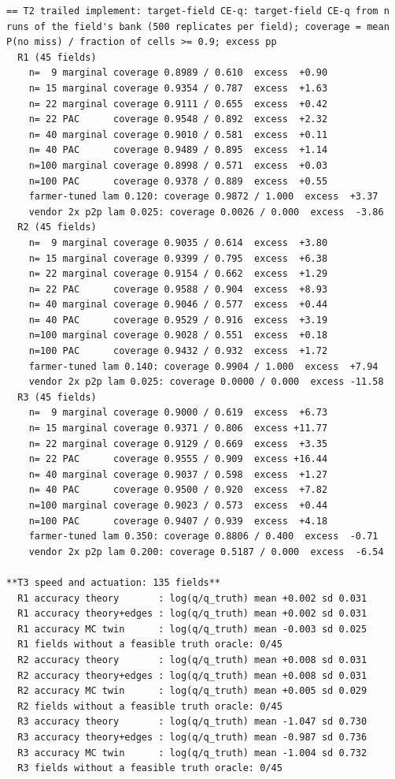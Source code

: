 \documentclass[preprint,12pt,authoryear]{elsarticle}
\begin{document}
\begin{Verbatim}[fontsize=\tiny,breaklines]
== T2 trailed implement: target-field CE-q: target-field CE-q from n runs of the field's bank (500 replicates per field); coverage = mean P(no miss) / fraction of cells >= 0.9; excess pp
  R1 (45 fields)
    n=  9 marginal coverage 0.8989 / 0.610  excess  +0.90
    n= 15 marginal coverage 0.9354 / 0.787  excess  +1.63
    n= 22 marginal coverage 0.9111 / 0.655  excess  +0.42
    n= 22 PAC      coverage 0.9548 / 0.892  excess  +2.32
    n= 40 marginal coverage 0.9010 / 0.581  excess  +0.11
    n= 40 PAC      coverage 0.9489 / 0.895  excess  +1.14
    n=100 marginal coverage 0.8998 / 0.571  excess  +0.03
    n=100 PAC      coverage 0.9378 / 0.889  excess  +0.55
    farmer-tuned lam 0.120: coverage 0.9872 / 1.000  excess  +3.37
    vendor 2x p2p lam 0.025: coverage 0.0026 / 0.000  excess  -3.86
  R2 (45 fields)
    n=  9 marginal coverage 0.9035 / 0.614  excess  +3.80
    n= 15 marginal coverage 0.9399 / 0.795  excess  +6.38
    n= 22 marginal coverage 0.9154 / 0.662  excess  +1.29
    n= 22 PAC      coverage 0.9588 / 0.904  excess  +8.93
    n= 40 marginal coverage 0.9046 / 0.577  excess  +0.44
    n= 40 PAC      coverage 0.9529 / 0.916  excess  +3.19
    n=100 marginal coverage 0.9028 / 0.551  excess  +0.18
    n=100 PAC      coverage 0.9432 / 0.932  excess  +1.72
    farmer-tuned lam 0.140: coverage 0.9904 / 1.000  excess  +7.94
    vendor 2x p2p lam 0.025: coverage 0.0000 / 0.000  excess -11.58
  R3 (45 fields)
    n=  9 marginal coverage 0.9000 / 0.619  excess  +6.73
    n= 15 marginal coverage 0.9371 / 0.806  excess +11.77
    n= 22 marginal coverage 0.9129 / 0.669  excess  +3.35
    n= 22 PAC      coverage 0.9555 / 0.909  excess +16.44
    n= 40 marginal coverage 0.9037 / 0.598  excess  +1.27
    n= 40 PAC      coverage 0.9500 / 0.920  excess  +7.82
    n=100 marginal coverage 0.9023 / 0.573  excess  +0.44
    n=100 PAC      coverage 0.9407 / 0.939  excess  +4.18
    farmer-tuned lam 0.350: coverage 0.8806 / 0.400  excess  -0.71
    vendor 2x p2p lam 0.200: coverage 0.5187 / 0.000  excess  -6.54

**T3 speed and actuation: 135 fields**
  R1 accuracy theory       : log(q/q_truth) mean +0.002 sd 0.031
  R1 accuracy theory+edges : log(q/q_truth) mean +0.002 sd 0.031
  R1 accuracy MC twin      : log(q/q_truth) mean -0.003 sd 0.025
  R1 fields without a feasible truth oracle: 0/45
  R2 accuracy theory       : log(q/q_truth) mean +0.008 sd 0.031
  R2 accuracy theory+edges : log(q/q_truth) mean +0.008 sd 0.031
  R2 accuracy MC twin      : log(q/q_truth) mean +0.005 sd 0.029
  R2 fields without a feasible truth oracle: 0/45
  R3 accuracy theory       : log(q/q_truth) mean -1.047 sd 0.730
  R3 accuracy theory+edges : log(q/q_truth) mean -0.987 sd 0.736
  R3 accuracy MC twin      : log(q/q_truth) mean -1.004 sd 0.732
  R3 fields without a feasible truth oracle: 0/45


\end{Verbatim}
\end{document}
